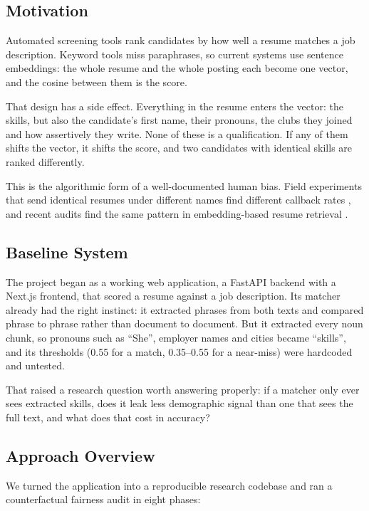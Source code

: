 \documentclass[conference,a4paper]{IEEEtran}
\begin{document}
\subsection{Motivation}
Automated screening tools rank candidates by how well a resume matches a job description. Keyword tools miss paraphrases, so current systems use sentence embeddings: the whole resume and the whole posting each become one vector, and the cosine between them is the score.

That design has a side effect. Everything in the resume enters the vector: the skills, but also the candidate's first name, their pronouns, the clubs they joined and how assertively they write. None of these is a qualification. If any of them shifts the vector, it shifts the score, and two candidates with identical skills are ranked differently.

This is the algorithmic form of a well-documented human bias. Field experiments that send identical resumes under different names find different callback rates \cite{bertrand}, and recent audits find the same pattern in embedding-based resume retrieval \cite{wilson}.

\subsection{Baseline System}
The project began as a working web application, a FastAPI backend with a Next.js frontend, that scored a resume against a job description. Its matcher already had the right instinct: it extracted phrases from both texts and compared phrase to phrase rather than document to document. But it extracted every noun chunk, so pronouns such as ``She'', employer names and cities became ``skills'', and its thresholds (0.55 for a match, 0.35–0.55 for a near-miss) were hardcoded and untested.

That raised a research question worth answering properly: if a matcher only ever sees extracted skills, does it leak less demographic signal than one that sees the full text, and what does that cost in accuracy?

\subsection{Approach Overview}
We turned the application into a reproducible research codebase and ran a counterfactual fairness audit in eight phases:
\end{document}
